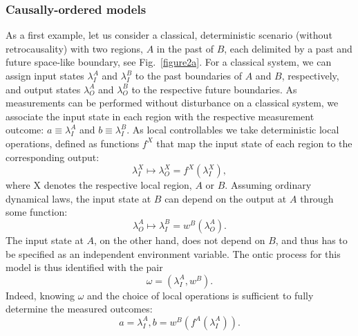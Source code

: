 \documentclass[a4paper,onecolumn,11pt,accepted=2018-05-04]{quantumarticle}
\begin{document}
\subsubsection{Causally-ordered models}
As a first example, let us consider a classical, deterministic scenario (without retrocausality) with two regions, $A$ in the past of $B$, each delimited by a past and future space-like boundary, see Fig.~\ref{figure2a}. For a classical system, we can assign input states $\lambda_I^A$ and $\lambda_I^B$ to the past boundaries of $A$ and $B$, respectively, and output states $\lambda_O^A$ and $\lambda_O^B$ to the respective future boundaries. As measurements can be performed without disturbance on a classical system, we associate the input state in each region with the respective measurement outcome: $a\equiv \lambda_I^A$ and $b \equiv \lambda_I^B$.
As local controllables we take deterministic local operations, defined as functions $f^X$ that map the input state of each region to the corresponding output:
\begin{equation}
 \lambda_I^X\mapsto\lambda_O^X=f^X\left(\lambda_I^X\right),
 \end{equation} where X denotes the respective local region, $A$ or $B$. 
Assuming ordinary dynamical laws, the input state at $B$ can depend on the output at $A$ through some function:
 \begin{equation}\lambda_O^A \mapsto \lambda_I^B = w^B\left(\lambda_O^A\right).
 \end{equation} The input state at $A$, on the other hand, does not depend on $B$, and thus has to be specified as an independent environment variable. The ontic process for this model is thus identified with the pair
 \begin{equation}
 \omega = \left(\lambda^A_I, w^B\right).
 \end{equation}
  Indeed, knowing $\omega$ and the choice of local operations is sufficient to fully determine the measured outcomes: 
  \begin{equation}
  a=\lambda^A_I, b= w^B\left(f^A\left(\lambda^A_I\right)\right).
  \end{equation} 
\end{document}
